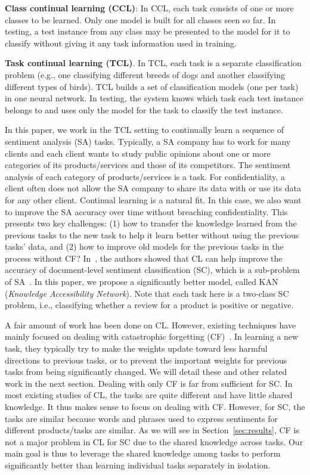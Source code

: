 \documentclass[runningheads]{llncs}
\begin{document}
\textbf{Class continual learning (CCL)}: In CCL, each task consists of one or more classes to be learned. Only one model is built for all classes seen so far. In testing, a test instance from any class may be presented to the model for it to classify without giving it any task information used in training. 

\textbf{Task continual learning (TCL)}. In TCL, each task is a separate classification problem (e.g., one classifying different breeds of dogs and another classifying different types of birds). TCL builds a set of classification models (one per task) in one neural network. In testing, the system knows which task each test instance belongs to and uses only the model for the task to classify the test instance. 

In this paper, we work in the TCL setting to continually learn a sequence of sentiment analysis (SA) tasks. Typically, a SA company has to work for many clients and each client wants to study public opinions about one or more categories of its products/services and those of its competitors. The sentiment analysis of each category of products/services is a task. For confidentiality, a client often does not allow the SA company to share its data with or use its data for any other client. Continual learning is a natural fit. In this case, we also want to improve the SA accuracy over time without breaching confidentiality. This presents two key challenges: (1) how to transfer the knowledge learned from the previous tasks to the new task to help it learn better without using the previous tasks' data, and (2) how to improve old models for the previous tasks in the process without CF? In~\cite{DBLP:conf/dasfaa/LvWLCZ19}, the authors showed that CL can help improve the accuracy of document-level sentiment classification (SC), which is a sub-problem of SA~\cite{liu2015sentiment}. In this paper, we propose a significantly better model, called KAN (\textit{Knowledge Accessibility Network}). Note that each task here is a two-class SC problem, i.e., classifying whether a review for a product is positive or negative. 

A fair amount of work has been done on CL. However, existing techniques have mainly focused on dealing with catastrophic forgetting (CF)~\cite{chen2018lifelong,Parisi2019continual}. In learning a new task, they typically try to make the weights update toward less harmful directions to previous tasks, or to prevent the important weights for previous tasks from being significantly changed. We will detail these and other related work in the next section. 
Dealing with only CF is far from sufficient for SC. In most existing studies of CL, the tasks are quite different and have little shared knowledge. It thus makes sense to focus on dealing with CF. However, for SC, the tasks are similar because words and phrases used to express sentiments for different products/tasks are similar. As we will see in Section~\ref{sec:results}, CF is not a major problem in CL for SC due to the shared knowledge across tasks. Our main goal is thus to leverage the shared knowledge among tasks to perform significantly better than learning individual tasks separately in isolation. 
\end{document}

